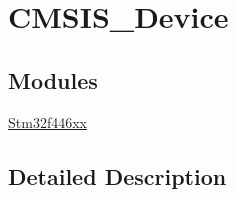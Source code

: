 \hypertarget{group___c_m_s_i_s___device}{}\section{C\+M\+S\+I\+S\+\_\+\+Device}
\label{group___c_m_s_i_s___device}
\subsection*{Modules}
\begin{DoxyCompactItemize}
\item 
\mbox{\hyperlink{group__stm32f446xx}{Stm32f446xx}}
\end{DoxyCompactItemize}


\subsection{Detailed Description}

